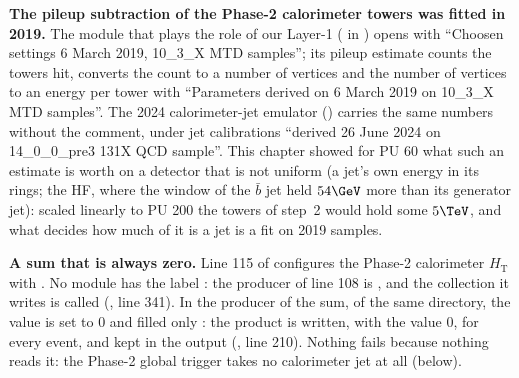 \textbf{The pileup subtraction of the Phase-2 calorimeter towers was fitted in 2019.} The module that plays the role of
our Layer-1 ( in ) opens with ``Choosen
settings 6 March 2019, 10\_3\_X MTD samples''; its pileup estimate counts the towers hit, converts the count to a
number of vertices and the number of vertices to an energy per tower with ``Parameters derived on 6 March 2019 on
10\_3\_X MTD samples''. The 2024 calorimeter-jet emulator () carries the same
numbers without the comment, under jet calibrations ``derived 26 June 2024 on 14\_0\_0\_pre3 131X QCD sample''. This
chapter showed for PU 60 what such an estimate is worth on a detector that is not uniform (a jet's own energy in its
rings; the HF, where the window of the $\bar b$ jet held $54\GeV$ more than its generator jet): scaled linearly to PU
200 the towers of step~2 would hold some $5\TeV$, and what decides how much of it is a jet is a fit on 2019 samples.

\textbf{A sum that is always zero.} Line 115 of  configures the Phase-2 calorimeter
$H_{\mathrm T}$ with . No module has the label :
the producer of line 108 is , and the collection it writes is called 
(, line 341). In the producer of the sum,
 of the same directory, the value is set to 0 and filled only : the product is written, with the value 0, for every event, and kept in the output
(, line 210). Nothing fails because nothing reads it: the Phase-2 global trigger
takes no calorimeter jet at all (below).

